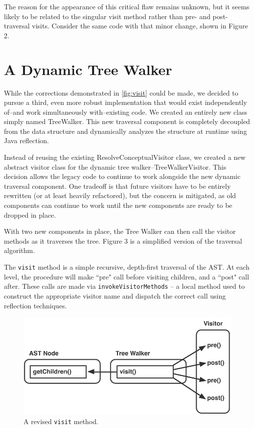 \documentclass[times]{speauth}
\begin{document}
The reason for the appearance of this critical flaw remains unknown, but it seems likely to be related to the singular visit method rather than pre- and post- traversal visits. Consider the same code with that minor change, shown in Figure 2.


\section{A Dynamic Tree Walker}
While the corrections demonstrated in \ref{fig:visit} could be made, we decided to pursue a third, even more robust implementation that would exist independently of--and work simultaneously with--existing code. We created an entirely new class simply named TreeWalker. This new traversal component is completely decoupled from the data structure and dynamically analyzes the structure at runtime using Java reflection.

Instead of reusing the existing ResolveConceptualVisitor class, we created a new abstract visitor class for the dynamic tree walker--TreeWalkerVisitor. This decision allows the legacy code to continue to work alongside the new dynamic traversal component. One tradeoff is that future visitors have to be entirely rewritten (or at least heavily refactored), but the concern is mitigated, as old components can continue to work until the new components are ready to be dropped in place.

With two new components in place, the Tree Walker can then call the visitor methods as it traverses the tree. Figure 3 is a simplified version of the traversal algorithm.

The \texttt{visit} method is a simple recursive, depth-first traversal of the AST. At each level, the procedure will make ``pre" call before visiting children, and a ``post" call after. These calls are made via \texttt{invokeVisitorMethods} -- a local method used to construct the appropriate visitor name and dispatch the correct call using reflection techniques.

\begin{figure}[!htb]
\centering
\includegraphics[scale=.60]{figures/prepostprepost.pdf}
\caption{A revised \texttt{visit} method.}
\end{figure}
\end{document}
